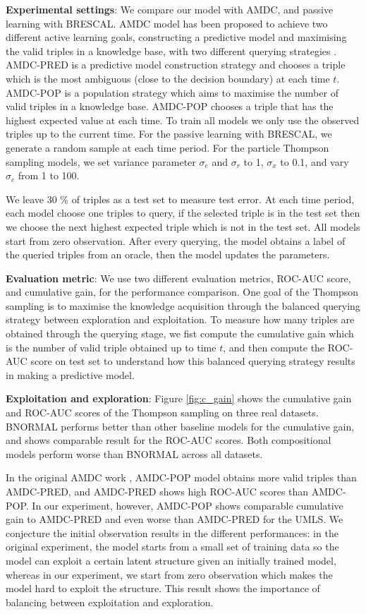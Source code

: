 \textbf{Experimental settings}: 
We compare our model with AMDC, and passive learning with BRESCAL.  
AMDC model has been proposed to achieve two different active learning goals, constructing a predictive
model and maximising the valid triples in a knowledge base, with two different querying strategies
 \cite{kajino2015active}. 
AMDC-PRED is a predictive model construction strategy and chooses a triple which is the most ambiguous (close to the decision boundary) at each time $t$.
AMDC-POP is a population strategy which aims to maximise the number of valid triples in a knowledge base. AMDC-POP chooses a triple that has the highest expected value at each time.  
To train all models we only use the observed triples up to the current time. For the passive learning with BRESCAL, we generate a random sample at each time period. For the particle Thompson sampling models, we set variance parameter $\sigma_e$ and $\sigma_r$ to 1, $\sigma_x$ to 0.1, and vary $\sigma_c$ from 1 to 100.

We leave 30 \% of triples as a test set to measure test error. 
At each time period, each model choose one triples to query, 
if the selected triple is in the test set then we choose the next highest expected triple which is not in the test set.
All models start from zero observation. 
After every querying, the model obtains a label of the queried triples from an oracle,
then the model updates the parameters. 

\textbf{Evaluation metric}: We use two different evaluation metrics, ROC-AUC score, and cumulative gain,
for the performance comparison. One goal of the Thompson sampling is to maximise the knowledge 
acquisition through the balanced querying strategy between exploration and exploitation. 
To measure how many triples are obtained through the querying stage, we fist compute the cumulative 
gain which is the number of valid triple obtained up to time $t$, and then compute the ROC-AUC score on 
test set to understand how this balanced querying strategy results in making a predictive model.

\textbf{Exploitation and exploration}: 
Figure \ref{fig:c_gain} shows 
the cumulative gain and ROC-AUC scores of the Thompson sampling on three real datasets.
BNORMAL performs better than other baseline models for the cumulative gain, and shows comparable result for the ROC-AUC scores. Both compositional models perform worse than BNORMAL across all datasets.

In the original AMDC work \cite{kajino2015active}, AMDC-POP model obtains more 
valid triples than AMDC-PRED, and AMDC-PRED shows high ROC-AUC scores than AMDC-POP. 
In our experiment, however, AMDC-POP shows comparable cumulative gain to AMDC-PRED 
and even worse than AMDC-PRED for the UMLS. We conjecture the initial observation 
results in the  different performances: in the original experiment, the model starts
from a small set of training data so the model can exploit a certain latent structure 
given an initially trained model, whereas in our experiment, we start from zero 
observation which makes the model hard to exploit the structure. This result shows 
the importance of balancing between exploitation and exploration.

